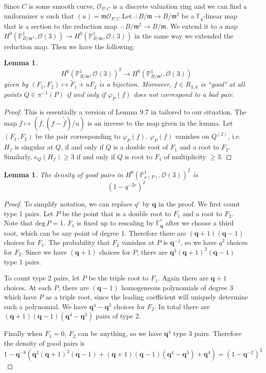 \documentclass[12pt]{article}
\theoremstyle{plain}
\newtheorem{lemma}[equation]{Lemma}
\theoremstyle{definition}
\newcommand{\fm}{\mathfrak{m}}
\newcommand{\IF}{\mathbb{F}}
\newcommand{\IP}{\mathbb{P}}
\newcommand{\sO}{\mathcal{O}}
\renewcommand{\deg}{\mathrm{deg}\,}
\newcommand\wb{\overline}
\newcommand{\<}{\langle}
\renewcommand{\>}{\rangle}
\def\wt{\widetilde}
\newcommand{\bq}{\mathbf{q}}
\begin{document}
Since $C$ is some smooth curve, $\sO_{P, C}$ is a discrete valuation ring and we can find a uniformizer $u$ such that $(u) = \fm \sO_{P, C}$.Let $\, \wt{} : B/\fm \to B/\fm^2$ be a $\IF_q$-linear map that is a section to the reduction map $\, \bar{} : B/\fm^2 \to B/\fm$. We extend it to a map $H^0(\IP^1_{B/\fm^2}, \sO(3)) \to H^0(\IP^1_{B/\fm}, \sO(3))$ in the same way we extended the reduction map. Then we have the following:
\begin{lemma}
$$ H^0(\IP^1_{B/\fm}, \sO(3))^2 \to H^0(\IP^1_{B/\fm^2}, \sO(3)) $$
given by $(F_1, F_2) \mapsto \wt{F}_1 + uF_2$ is a bijection. Moreover, $f \in R_{3, d}$ is ``good" at all points $Q \in \pi^{-1}(P)$ if and only if $\varphi_P(f)$ does not correspond to a bad pair. 
\end{lemma}
\begin{proof}
This is essentially a version of Lemma 9.7 in \cite{Wood} tailored to our situation. The map $f \mapsto ( \wb{f}, (f - \wt{\wb{f}})/u)$ is an inverse to the map given in the lemma. Let $(F_1, F_2)$ be the pair corresponding to $\varphi_P(f)$. $\varphi_P(f)$ vanishes on $Q^{(2)}$, i.e. $H_f$ is singular at $Q$, if and only if $Q$ is a double root of $F_1$ and a root to $F_2$. Similarly, $e_Q(H_f) \ge 3$ if and only if $Q$ is root to $F_1$ of multiplicity $\ge 3$. 
\end{proof}

\begin{lemma}
\label{count}
The density of good pairs in $H^0(\IP^1_{\kappa(P)}, \sO(3))^2$ is 
$$ (1 - q^{-2e})^{2} $$
\end{lemma}
\begin{proof}
To simplify notation, we can replace $q^e$ by $\bq$ in the proof. We first count type 1 pairs. Let $P$ be the point that is a double root to $F_1$ and a root to $F_2$. Note that $\deg P = 1$. $F_1$ is fixed up to rescaling by $\IF_\bq^*$ after we choose a third root, which can be any point of degree $1$. Therefore there are $(\bq + 1)(\bq - 1)$ choices for $F_1$. The probability that $F_2$ vanishes at $P$ is $\bq^{-1}$, so we have $q^3$ choices for $F_2$. Since we have $(\bq + 1)$ choices for $P$, there are $\bq^3(\bq + 1)^2(\bq - 1)$ type 1 pairs. 

To count type 2 pairs, let $P$ be the triple root to $F_1$. Again there are $\bq + 1$ choices. At each $P$, there are $(\bq-1)$ homogeneous polynomials of degree $3$ which have $P$ as a triple root, since the leading coefficient will uniquely determine such a polynomial. We have $\bq^4 - \bq^3$ choices for $F_2$. In total there are $ (\bq + 1)(\bq - 1)(\bq^4 - \bq^3)$
pairs of type 2. 

Finally when $F_1 = 0$, $F_2$ can be anything, so we have $\bq^4$ type 3 pairs.
Therefore the density of good pairs is 
$$ 1 - \bq^{-8}(\bq^3(\bq + 1)^2(\bq - 1) + (\bq + 1)(\bq - 1)(\bq^4 - \bq^3) + \bq^4) = (1 - \bq^{-2})^2 $$ 
\end{proof}
\end{document}
